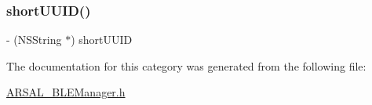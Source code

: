 \subsubsection{\texorpdfstring{short\+U\+U\+I\+D()}{shortUUID()}}
{\footnotesize\ttfamily -\/ (N\+S\+String $\ast$) short\+U\+U\+ID \begin{DoxyParamCaption}{ }\end{DoxyParamCaption}}



The documentation for this category was generated from the following file\+:\begin{DoxyCompactItemize}
\item 
\hyperlink{ARSAL__BLEManager_8h}{A\+R\+S\+A\+L\+\_\+\+B\+L\+E\+Manager.\+h}\end{DoxyCompactItemize}
